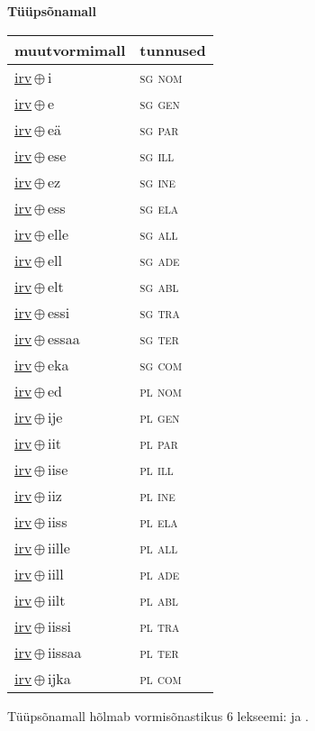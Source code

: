 

\vspace{3.5em}
\noindent \begin{minipage}{\textwidth}
\noindent \textbf{Tüüpsõnamall \,}\\

\begin{sideways}
\begin{tabular}{l l}
muutvormimall & tunnused \\
\hline
\underline{irv}\,$\oplus$\,i & \textsc{ sg nom } \\
\underline{irv}\,$\oplus$\,e & \textsc{ sg gen } \\
\underline{irv}\,$\oplus$\,eä & \textsc{ sg par } \\
\underline{irv}\,$\oplus$\,ese & \textsc{ sg ill } \\
\underline{irv}\,$\oplus$\,ez & \textsc{ sg ine } \\
\underline{irv}\,$\oplus$\,ess & \textsc{ sg ela } \\
\underline{irv}\,$\oplus$\,elle & \textsc{ sg all } \\
\underline{irv}\,$\oplus$\,ell & \textsc{ sg ade } \\
\underline{irv}\,$\oplus$\,elt & \textsc{ sg abl } \\
\underline{irv}\,$\oplus$\,essi & \textsc{ sg tra } \\
\underline{irv}\,$\oplus$\,essaa & \textsc{ sg ter } \\
\underline{irv}\,$\oplus$\,eka & \textsc{ sg com } \\
\underline{irv}\,$\oplus$\,ed & \textsc{ pl nom } \\
\underline{irv}\,$\oplus$\,ije & \textsc{ pl gen } \\
\underline{irv}\,$\oplus$\,iit & \textsc{ pl par } \\
\underline{irv}\,$\oplus$\,iise & \textsc{ pl ill } \\
\underline{irv}\,$\oplus$\,iiz & \textsc{ pl ine } \\
\underline{irv}\,$\oplus$\,iiss & \textsc{ pl ela } \\
\underline{irv}\,$\oplus$\,iille & \textsc{ pl all } \\
\underline{irv}\,$\oplus$\,iill & \textsc{ pl ade } \\
\underline{irv}\,$\oplus$\,iilt & \textsc{ pl abl } \\
\underline{irv}\,$\oplus$\,iissi & \textsc{ pl tra } \\
\underline{irv}\,$\oplus$\,iissaa & \textsc{ pl ter } \\
\underline{irv}\,$\oplus$\,ijka & \textsc{ pl com } \\
\end{tabular}
\end{sideways}
\label{tab:tüüpsõnamall-irvi}

\end{minipage}

 
\vspace{1em}
\noindent Tüüpsõnamall  hõlmab vormisõnastikus 6 lekseemi:  ja .
